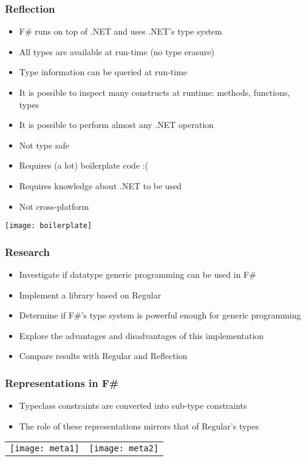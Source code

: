 \documentclass{beamer}
\begin{document}
\begin{frame}

  \frametitle{Reflection}

  \begin{itemize}
  \item F\# runs on top of .NET and uses .NET's type system
  \item All types are available at run-time (no type erasure)
  \item Type information can be queried at run-time
  \item It is possible to inspect many constructs at runtime: methods, functions, types
  \item It is possible to perform almost any .NET operation
  \item Not type safe
  \item Requires (a lot) boilerplate code :(
  \item Requires knowledge about .NET to be used
  \item Not cross-platform
    
  \end{itemize}

  \centering\texttt{[image: boilerplate]}
  
\end{frame}

\begin{frame}

  \frametitle{Research}

  \begin{itemize}
  \item Investigate if datatype generic programming can be used in F\#
  \item Implement a library based on Regular
  \item Determine if F\#'s type system is powerful enough for generic programming
  \item Explore the advantages and disadvantages of this implementation
  \item Compare results with Regular and Reflection
    
  \end{itemize}
    
\end{frame}

\begin{frame}

  \frametitle{Representations in F\#}
  \begin{itemize}
  \item Typeclass constraints are converted into sub-type constraints
  \item The role of these representations mirrors that of Regular's
    types
  \end{itemize}
  
  \begin{tabular}{cc}
    \texttt{[image: meta1]} & \texttt{[image: meta2]} \\
  \end{tabular}
  
\end{frame}
\end{document}
